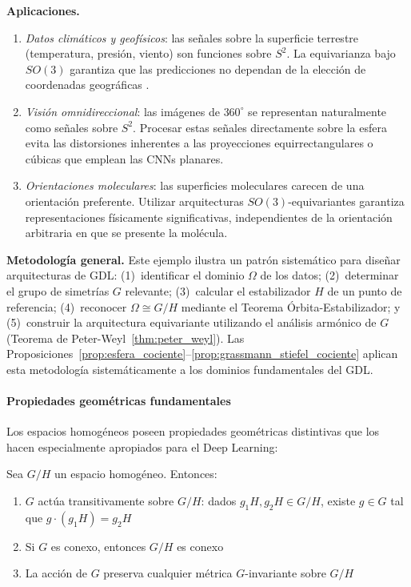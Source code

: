 \begin{example}
\textbf{Aplicaciones.}
\begin{enumerate}
    \item \emph{Datos climáticos y geofísicos}: las señales sobre la superficie terrestre (temperatura, presión, viento) son funciones sobre $S^2$. La equivarianza bajo $SO(3)$ garantiza que las predicciones no dependan de la elección de coordenadas geográficas \citep{cohen2018sphericalcnns}.

    \item \emph{Visión omnidireccional}: las imágenes de $360^\circ$ se representan naturalmente como señales sobre $S^2$. Procesar estas señales directamente sobre la esfera evita las distorsiones inherentes a las proyecciones equirrectangulares o cúbicas que emplean las \glspl{CNN} planares.

    \item \emph{Orientaciones moleculares}: las superficies moleculares carecen de una orientación preferente. Utilizar arquitecturas $SO(3)$-equivariantes garantiza representaciones físicamente significativas, independientes de la orientación arbitraria en que se presente la molécula.
\end{enumerate}

\textbf{Metodología general.}
Este ejemplo ilustra un patrón sistemático para diseñar arquitecturas de \gls{GDL}: (1)~identificar el dominio $\Omega$ de los datos; (2)~determinar el grupo de simetrías $G$ relevante; (3)~calcular el estabilizador $H$ de un punto de referencia; (4)~reconocer $\Omega \cong G/H$ mediante el Teorema Órbita-Estabilizador; y (5)~construir la arquitectura equivariante utilizando el análisis armónico de $G$ (Teorema de Peter-Weyl~\ref{thm:peter_weyl}). Las Proposiciones~\ref{prop:esfera_cociente}--\ref{prop:grassmann_stiefel_cociente} aplican esta metodología sistemáticamente a los dominios fundamentales del \gls{GDL}.
\end{example}

\paragraph{Propiedades geométricas fundamentales}

Los espacios homogéneos poseen propiedades geométricas distintivas que los hacen especialmente apropiados para el Deep Learning:

\begin{proposition}\label{prop:transitividad_espacios_homogeneos}
Sea $G/H$ un espacio homogéneo. Entonces:
\begin{enumerate}
    \item $G$ actúa transitivamente sobre $G/H$: dados $g_1H, g_2H \in G/H$, existe $g \in G$ tal que $g \cdot (g_1H) = g_2H$
    \item Si $G$ es conexo, entonces $G/H$ es conexo
    \item La acción de $G$ preserva cualquier métrica $G$-invariante sobre $G/H$
\end{enumerate}
\end{proposition}

